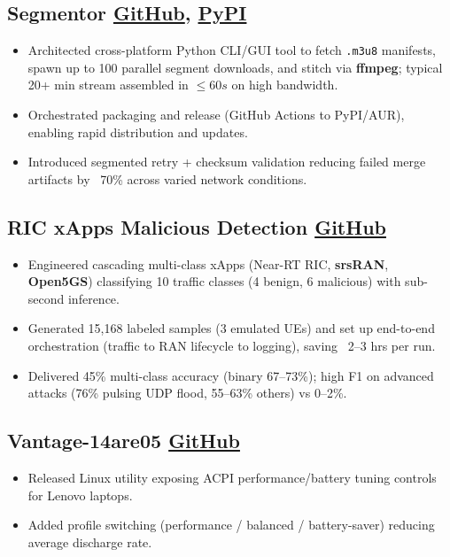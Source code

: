 \documentclass[letterpaper,11pt]{article}
\newcommand{\rside}[1]{
  \hfill {\small\color{accent} #1}%
}
\begin{document}
\subsection{Segmentor \rside{\href{https://github.com/ayushjaipuriyar/animepahe-dl}{GitHub}, \href{https://pypi.org/project/animepahe-dl/}{PyPI}}}
\begin{itemize}
  \item Architected cross-platform Python CLI/GUI tool to fetch \texttt{.m3u8} manifests, spawn up to 100 parallel segment downloads, and stitch via \textbf{ffmpeg}; typical 20+ min stream assembled in $\le 60s$ on high bandwidth.
  \item Orchestrated packaging and release (GitHub Actions to PyPI/AUR), enabling rapid distribution and updates.
  \item Introduced segmented retry + checksum validation reducing failed merge artifacts by ~70\% across varied network conditions.
\end{itemize}

\subsection{RIC xApps Malicious Detection \rside{\href{https://github.com/ayushjaipuriyar/ric-xapps-malicious-detection}{GitHub}}}
\begin{itemize}
  \item Engineered cascading multi-class xApps (Near-RT RIC, \textbf{srsRAN}, \textbf{Open5GS}) classifying 10 traffic classes (4 benign, 6 malicious) with sub-second inference.
  \item Generated 15,168 labeled samples (3 emulated UEs) and set up end-to-end orchestration (traffic to RAN lifecycle to logging), saving ~2--3 hrs per run.
  \item Delivered 45\% multi-class accuracy (binary 67--73\%); high F1 on advanced attacks (76\% pulsing UDP flood, 55--63\% others) vs 0--2\%.
\end{itemize}

\subsection{Vantage-14are05 \rside{\href{https://github.com/ayushjaipuriyar/vantage-14are05}{GitHub}}}
\begin{itemize}
  \item Released Linux utility exposing ACPI performance/battery tuning controls for Lenovo laptops.
  \item Added profile switching (performance / balanced / battery-saver) reducing average discharge rate.
  \end{itemize}
\end{document}
